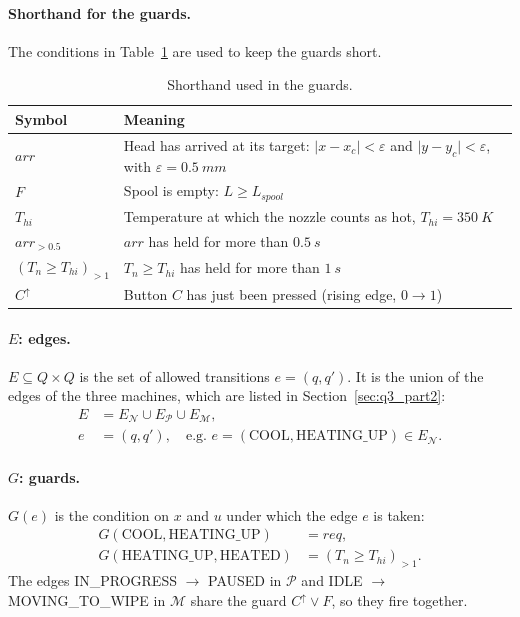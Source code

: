 \paragraph{Shorthand for the guards.} The conditions in Table~\ref{tab:q3_shorthand} are used to keep the guards short.

\begin{table}[H]
    \centering
    \normalsize
    \caption{Shorthand used in the guards.}
    \label{tab:q3_shorthand}
    \begin{tabular}{@{}lp{}@{}}
        \toprule
        Symbol & Meaning \\
        \midrule
        $\mathit{arr}$ & Head has arrived at its target: $\lvert x - x_c\rvert < \varepsilon$ and $\lvert y - y_c\rvert < \varepsilon$, with $\varepsilon = \SI{0.5}{mm}$ \\
        $F$ & Spool is empty: $L \ge L_{spool}$ \\
        $T_{hi}$ & Temperature at which the nozzle counts as hot, $T_{hi} = \SI{350}{K}$ \\
        $\mathit{arr}_{>0.5}$ & $\mathit{arr}$ has held for more than $\SI{0.5}{s}$ \\
        $(T_n \ge T_{hi})_{>1}$ & $T_n \ge T_{hi}$ has held for more than $\SI{1}{s}$ \\
        $C^{\uparrow}$ & Button $C$ has just been pressed (rising edge, $0 \to 1$) \\
        \bottomrule
    \end{tabular}
\end{table}

\paragraph{\texorpdfstring{$E$}{E}: edges.} $E \subseteq Q \times Q$ is the set of allowed transitions $e = (q, q')$. It is the union of the edges of the three machines, which are listed in Section~\ref{sec:q3_part2}:
\begin{align*}
    E &= E_{\mathcal{N}} \cup E_{\mathcal{P}} \cup E_{\mathcal{M}}, \\
    e &= (q, q'), \quad \text{e.g. } e = (\text{COOL}, \text{HEATING\_UP}) \in E_{\mathcal{N}}.
\end{align*}

\paragraph{\texorpdfstring{$G$}{G}: guards.} $G(e)$ is the condition on $x$ and $u$ under which the edge $e$ is taken:
\begin{align*}
    G(\text{COOL}, \text{HEATING\_UP}) &= \mathit{req}, \\
    G(\text{HEATING\_UP}, \text{HEATED}) &= (T_n \ge T_{hi})_{>1}.
\end{align*}
The edges IN\_PROGRESS $\to$ PAUSED in $\mathcal{P}$ and IDLE $\to$ MOVING\_TO\_WIPE in $\mathcal{M}$ share the guard $C^{\uparrow} \vee F$, so they fire together.

